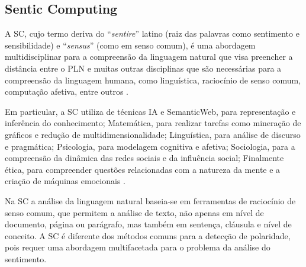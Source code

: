 \documentclass[
	12pt,				%
	openright,			%
	oneside,			%
	a4paper,			%
	english,			%
	spanish,			%
	brazil				%
	]{abntex2}
\begin{document}
\subsection{Sentic Computing}

A \gls{SC}, cujo termo deriva do ``\emph{sentire}'' latino (raiz das palavras como sentimento e sensibilidade) e ``\emph{sensus}'' (como em senso comum), é uma abordagem multidisciplinar para a compreensão da linguagem natural que visa preencher a distância entre o \gls{PLN} e muitas outras disciplinas que são necessárias para a compreensão da linguagem humana, como linguística, raciocínio de senso comum, computação afetiva, entre outros \cite{book_Cambria2015}.

Em particular, a \gls{SC} utiliza de técnicas \gls{IA} e SemanticWeb, para representação e inferência do conhecimento; Matemática, para realizar tarefas como mineração de gráficos e redução de multidimensionalidade; Linguística, para análise de discurso e pragmática; Psicologia, para modelagem cognitiva e afetiva; Sociologia, para a compreensão da dinâmica das redes sociais e da influência social; Finalmente ética, para compreender questões relacionadas com a natureza da mente e a criação de máquinas emocionais \cite{inBook_Bisio2017}.

Na \gls{SC} a análise da linguagem natural baseia-se em ferramentas de raciocínio de senso comum, que permitem a análise de texto, não apenas em nível de documento, página ou parágrafo, mas também em sentença, cláusula e nível de conceito. A \gls{SC} é diferente dos métodos comuns para a detecção de polaridade, pois requer uma abordagem multifacetada para o problema da análise do sentimento.
\end{document}
